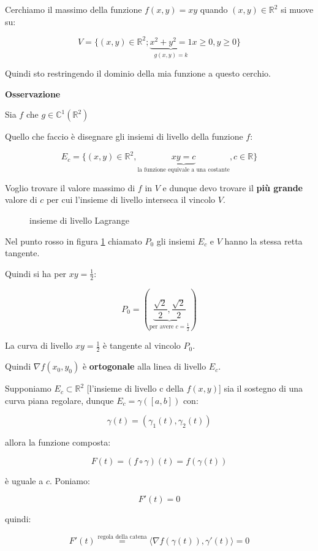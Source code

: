 \documentclass[../appunti-analisi.tex]{subfiles}
\begin{document}
Cerchiamo il massimo della funzione $f(x,y) = xy$ quando $(x,y) \in \mathbb{R}^{2}$ si muove su:

\[
    V= \{(x,y) \in \mathbb{R}^{2};\underbrace{ x^{2}+y^{2}=1}_\text{$g(x,y) = k$} x \ge 0, y \ge 0\}
\]

Quindi sto restringendo il dominio della mia funzione a questo cerchio.

\textbf{Osservazione} 

Sia $f$ che $g \in \mathbb{C}^{1}(\mathbb{R}^{2})$

Quello che faccio è disegnare gli insiemi di livello della funzione $f$:

\[
    E_c = \{(x,y) \in \mathbb{R}^{2}, \underbrace{xy = c}_\text{la funzione equivale a una costante}, c \in \mathbb{R}\}
\]

Voglio trovare il valore massimo di $f$ in $V$ e dunque devo trovare il \textbf{più grande} valore di $c$ per cui l'insieme di livello interseca il vincolo $V$.


\begin{figure}[ht]
    \caption{insieme di livello Lagrange}
    \label{fig:insieme-di-livello-lagrange}
\end{figure}

Nel punto rosso in figura \ref{fig:insieme-di-livello-lagrange} chiamato $P_0$ gli insiemi $E_c$ e $V$ hanno la stessa retta tangente.

Quindi si ha per $xy = \frac{1}{2}$:

\[
P_0 = ( \underbrace{\frac{\sqrt{2}}{2}, \frac{\sqrt{2}}{2}}_\text{per avere $c= \frac{1}{2}$})
\]

La curva di livello $xy=\frac{1}{2}$ è tangente al vincolo $P_0$.

Quindi $\nabla f(x_0,y_0)$ è \textbf{ortogonale} alla linea di livello $E_c$.

Supponiamo $E_c \subset \mathbb{R}^{2}$ [l'insieme di livello c della $f(x,y)$] sia il sostegno di una curva piana regolare, dunque $E_c = \gamma([a,b])$ con:

\[
    \gamma(t) = (\gamma_1(t), \gamma_2(t))
\]

allora la funzione composta:

\[
    F(t) = (f \circ \gamma) (t) = f(\gamma(t))
\]

è uguale a $c$. Poniamo:

\[
    F'(t)=0
\]

quindi:

\[
    F'(t) \overset{\text{regola della catena}}{=} \langle \nabla f(\gamma(t)), \gamma'(t) \rangle = 0
\]
\end{document}
